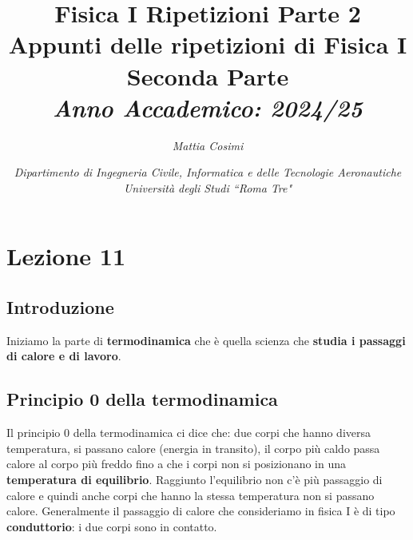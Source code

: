 \documentclass{article}
\numberwithin{equation}{subsection}
\begin{document}
\title{%
    \textbf{Fisica I Ripetizioni Parte 2}  \\ 
    \large Appunti delle ripetizioni di Fisica I Seconda Parte\\
    \textit{Anno Accademico: 2024/25}}
\author{\textit{Mattia Cosimi}}
\date{\textit{Dipartimento di Ingegneria Civile, Informatica e delle Tecnologie Aeronautiche \\
Università degli Studi ``Roma Tre"}}

\maketitle


\clearpage

\pagestyle{fancy}
\fancyhead{}\fancyfoot{}
\fancyfoot[C]{\thepage}

\tableofcontents

\clearpage

\section{Lezione 11}
\subsection{Introduzione}
Iniziamo la parte di \textbf{termodinamica} che è quella scienza che \textbf{studia i passaggi di calore e di lavoro}.
\subsection{Principio 0 della termodinamica}
Il principio 0 della termodinamica ci dice che: due corpi che hanno diversa temperatura, si passano calore (energia in transito), il corpo più caldo passa calore al corpo più freddo fino a che i corpi non si posizionano in una \textbf{temperatura di equilibrio}. Raggiunto l'equilibrio non c'è più passaggio di calore e quindi anche corpi che hanno la stessa temperatura non si passano calore. Generalmente il passaggio di calore che consideriamo in fisica I è di tipo \textbf{conduttorio}: i due corpi sono in contatto.
\end{document}

